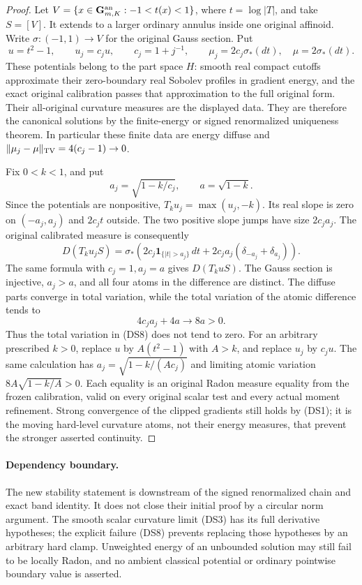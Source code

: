 \documentclass[11pt,a4paper]{article}
\numberwithin{equation}{section}
\theoremstyle{definition}
\theoremstyle{remark}
\begin{document}
\begin{proof}
Let $V=\{x\in\mathbf G_{m,K}^{\rm an}:-1<t(x)<1\}$,
where $t=\log|T|$, and take $S=[V]$.  It extends to a larger
ordinary annulus inside one original affinoid.  Write
$\sigma:(-1,1)\to V$ for the original Gauss section.  Put
\[
 u=t^2-1,\qquad u_j=c_j u,\qquad c_j=1+j^{-1},
 \qquad \mu_j=2c_j\sigma_*(dt),\quad\mu=2\sigma_*(dt).
 \tag{DS9}
\]
These potentials belong to the part space $H$: smooth real
compact cutoffs approximate their zero-boundary real Sobolev
profiles in gradient energy, and the exact original calibration
passes that approximation to the full original form.  Their
all-original curvature measures are the displayed data.
They are therefore the canonical solutions by the finite-energy
or signed renormalized uniqueness theorem.  In particular these
finite data are energy diffuse and
$\|\mu_j-\mu\|_{\rm TV}=4(c_j-1)\to0$.

Fix $0<k<1$, and put
\[
                  a_j=\sqrt{1-k/c_j},\qquad a=\sqrt{1-k}.
\]
Since the potentials are nonpositive, $T_ku_j=\max(u_j,-k)$.
Its real slope is zero on $(-a_j,a_j)$ and $2c_jt$ outside.
The two positive slope jumps have size $2c_ja_j$.  The
original calibrated measure is consequently
\[
 D(T_ku_jS)
  =\sigma_*\left(2c_j\mathbf1_{\{|t|>a_j\}}\,dt
                +2c_ja_j(\delta_{-a_j}+\delta_{a_j})\right).
 \tag{DS10}
\]
The same formula with $c_j=1,a_j=a$ gives $D(T_kuS)$.
The Gauss section is injective, $a_j>a$, and all four atoms
in the difference are distinct.  The diffuse parts converge
in total variation, while the total variation of the atomic
difference tends to
\[
                         4c_ja_j+4a\longrightarrow8a>0.
 \tag{DS11}
\]
Thus the total variation in (DS8) does not tend to zero.
For an arbitrary prescribed $k>0$, replace $u$ by
$A(t^2-1)$ with $A>k$, and replace $u_j$ by $c_j u$.
The same calculation has $a_j=\sqrt{1-k/(Ac_j)}$ and
limiting atomic variation $8A\sqrt{1-k/A}>0$.
Each equality is an original Radon measure equality from the
frozen calibration, valid on every original scalar test and
every actual moment refinement.  Strong convergence of the
clipped gradients still holds by (DS1); it is the moving
hard-level curvature atoms, not their energy measures, that
prevent the stronger asserted continuity.
\end{proof}

\paragraph{Dependency boundary.}
The new stability statement is downstream of the signed
renormalized chain and exact band identity.  It does not close
their initial proof by a circular norm argument.  The smooth
scalar curvature limit (DS3) has its full derivative hypotheses;
the explicit failure (DS8) prevents replacing those hypotheses
by an arbitrary hard clamp.  Unweighted energy of an unbounded
solution may still fail to be locally Radon, and no ambient
classical potential or ordinary pointwise boundary value is
asserted.
\end{document}
